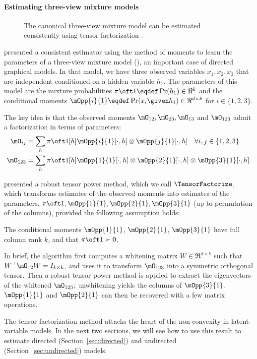\paragraph{Estimating three-view mixture models}

\begin{figure}[t]
  \label{fig:three-view}
  \centering
  
  \caption{The canonical three-view mixture model can be estimated consistently using tensor factorization \citep{anandkumar13tensor}.}
\end{figure}

\citet{anandkumar12moments} presented a consistent estimator
  using the method of moments to learn the parameters of a three-view
  mixture model (), an important case of directed
  graphical models. %
In that model, we have three observed variables $x_1, x_2, x_3$
  that are independent conditioned on a hidden variable $h_1$.  
The parameters of this model are the mixture probabilities $\pi\oft 1 \eqdef
  \Pr(h_1) \in \Re^k$ and the conditional moments $\mOpp{i}{1} \eqdef
  \Pr(x_i \given h_1) \in \Re^{d \times k}$ for $i \in \{1,2,3\}$.

  The key idea is that the observed moments $\mO_{12}, \mO_{23}, \mO_{13}$ and
  $\mO_{123}$ admit a factorization in terms of parameters:
\begin{align*}
  \mO_{ij} &= \sum_h {\pi \oft 1}[h] {\mOpp{i}{1}}[\cdot,h] \otimes {\mOpp{j}{1}}[\cdot,h] \quad \forall i,j \in \{1,2,3\} \\
  \mO_{123} &= \sum_h {\pi \oft 1}[h] {\mOpp{1}{1}}[\cdot,h] \otimes {\mOpp{2}{1}}[\cdot,h] \otimes  {\mOpp{3}{1}}[\cdot,h].
\end{align*}

\citet{anandkumar13tensor} presented a robust tensor power method, which
  we call $\TensorFactorize$, which transforms estimates of the observed moments 
  into estimates of the parameters, $\pi\oft 1, \mOpp{1}{1},
  \mOpp{2}{1},\mOpp{3}{1}$ (up to permutation of the columns), provided
  the following assumption holds:

\begin{assumption}
\label{asm:full-rank}
The conditional moments $\mOpp{1}{1}$, $\mOpp{2}{1}$, $\mOpp{3}{1}$ have full column rank
  $k$, and that $\pi\oft 1 \succ 0$.
\end{assumption}

In brief, the algorithm first computes a whitening matrix $W \in
  \Re^{d \times k}$ such that $W^\top \mO_{12} W = I_{k \times k}$,
  and uses it to transform $\mO_{123}$ into a symmetric orthogonal tensor.  
Then a robust tensor power method is applied to extract the eigenvectors
of the whitened $\mO_{123}$; unwhitening yields the columns of $\mOpp{3}{1}$.
  $\mOpp{1}{1}$ and $\mOpp{2}{1}$ can then be recovered with a few matrix operations.

The tensor factorization method attacks the heart of the non-convexity
  in latent-variable models.  In the next two sections,
  we will see how to use this result to estimate directed (Section~\ref{sec:directed})
  and undirected (Section~\ref{sec:undirected}) models.
